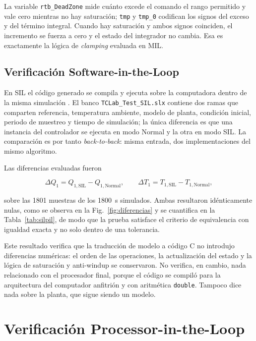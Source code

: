 \documentclass[conference,a4paper,10pt]{IEEEtran}
\begin{document}
La variable \texttt{rtb\_DeadZone} mide cuánto excede el comando el rango permitido y vale cero
mientras no hay saturación; \texttt{tmp} y \texttt{tmp\_0} codifican los signos del exceso y del
término integral. Cuando hay saturación y ambos signos coinciden, el incremento se fuerza a cero y
el estado del integrador no cambia. Esa es exactamente la lógica de \emph{clamping} evaluada en
MIL.

\subsection{Verificación Software-in-the-Loop}

En SIL el código generado se compila y ejecuta sobre la computadora dentro de la misma simulación
\cite{mw_sil}. El banco \texttt{TCLab\_Test\_SIL.slx} contiene dos ramas que comparten referencia,
temperatura ambiente, modelo de planta, condición inicial, periodo de muestreo y tiempo de
simulación; la única diferencia es que una instancia del controlador se ejecuta en modo Normal y la
otra en modo SIL. La comparación es por tanto \emph{back-to-back}: misma entrada, dos
implementaciones del mismo algoritmo.

Las diferencias evaluadas fueron

\begin{equation}
\Delta Q_1 = Q_{1,\mathrm{SIL}} - Q_{1,\mathrm{Normal}},
\qquad
\Delta T_1 = T_{1,\mathrm{SIL}} - T_{1,\mathrm{Normal}},
\label{eq:difsil}
\end{equation}

sobre las \num{1801} muestras de los \SI{1800}{\second} simulados. Ambas resultaron idénticamente
nulas, como se observa en la Fig.~\ref{fig:diferencias} y se cuantifica en la
Tabla~\ref{tab:silpil}, de modo que la prueba satisface el criterio de equivalencia con igualdad
exacta y no solo dentro de una tolerancia.

Este resultado verifica que la traducción de modelo a código C no introdujo diferencias numéricas:
el orden de las operaciones, la actualización del estado y la lógica de saturación y anti-windup se
conservaron. No verifica, en cambio, nada relacionado con el procesador final, porque el código se
compiló para la arquitectura del computador anfitrión y con aritmética \texttt{double}. Tampoco
dice nada sobre la planta, que sigue siendo un modelo.

\section{Verificación Processor-in-the-Loop}
\end{document}
